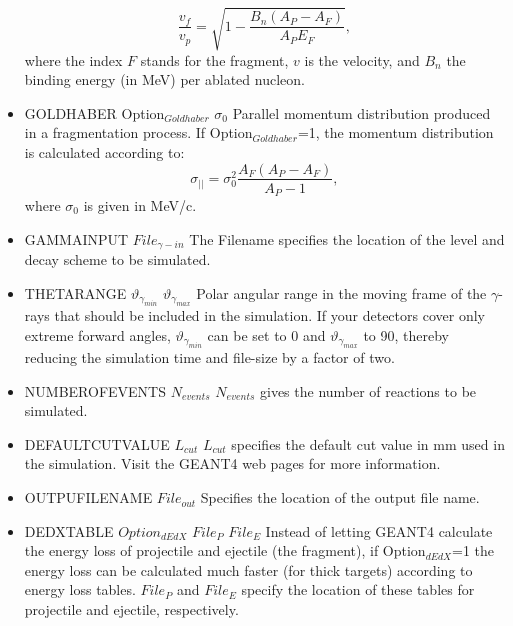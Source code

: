 \documentclass[12pt]{book}
\begin{document}
\begin{itemize}
  \begin{equation}
    \frac{v_{f}}{v_{p}} = \sqrt{1-\frac{B_{n}(A_{P}-A_{F})}{A_{P}E_{F}}},
  \end{equation}
  where the index $F$ stands for the fragment,  $v$ is the velocity, 
  and $B_n$ the binding energy (in MeV) per ablated nucleon.
\item GOLDHABER Option$_{Goldhaber}$ $\sigma_{0}$\hfill{} \linebreak
  Parallel momentum distribution produced in a fragmentation process. If Option$_{Goldhaber}$=1, the momentum 
  distribution is calculated according to: 
  \begin{equation}
    \sigma_{||}=\sigma_{0}^{2} \frac{A_{F}(A_{P}-A_{F})}{A_{P}-1},
  \end{equation}
  where $\sigma_{0}$ is given in MeV/c.
\item GAMMAINPUT $File_{\gamma-in}$\hfill{} \linebreak
  The Filename specifies the location of the level and decay scheme to be simulated.
\item THETARANGE $\vartheta_{\gamma_{min}}$ $\vartheta_{\gamma_{max}}$\hfill{} \linebreak
  Polar angular range in the moving frame of the $\gamma$-rays that should be included in the simulation. 
  If your detectors cover only extreme forward angles, $\vartheta_{\gamma_{min}}$ can be set to 0 and 
  $\vartheta_{\gamma_{max}}$ to 90, thereby reducing the simulation time and file-size by a factor of two.
\item NUMBEROFEVENTS $N_{events}$\hfill{} \linebreak
  $N_{events}$ gives the number of reactions to be simulated.
\item DEFAULTCUTVALUE $L_{cut}$\hfill{} \linebreak
  $L_{cut}$ specifies the default cut value in mm used in the simulation. Visit the GEANT4 web pages for more information.
\item OUTPUFILENAME $File_{out}$\hfill{} \linebreak
  Specifies the location of the output file name.
\item DEDXTABLE $Option_{dEdX}$ $File_{P}$ $File_{E}$\hfill{} \linebreak
  Instead of letting GEANT4 calculate the energy loss of projectile and ejectile (the fragment), if Option$_{dEdX}$=1
  the energy loss can be calculated much faster (for thick targets) according to energy loss tables. 
  $File_{P}$ and $File_{E}$ specify the location of these tables for projectile and ejectile, respectively.

\end{itemize}
\end{document}

